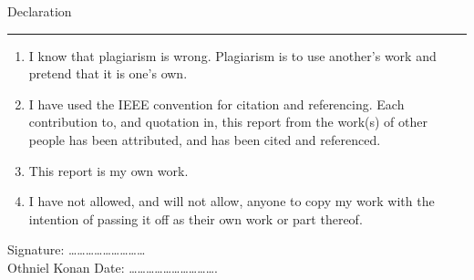 {\Large Declaration}\\
\hrule

\vskip 10mm
\begin{enumerate}
\item I know that plagiarism is wrong. Plagiarism is to use another's work and pretend that it is one's
own.
\item I have used the IEEE convention for citation and referencing. Each contribution to, and quotation in,
this report from the work(s) of other people has been attributed, and has been cited and
referenced.
\item This report is my own work.
\item I have not allowed, and will not allow, anyone to copy my work with the intention of passing it off
as their own work or part thereof.
\end{enumerate}
\vskip 10mm
Signature: \ldots\ldots\ldots\ldots\ldots\ldots\ldots\ldots\ldots 
\\Othniel Konan		%
\vskip 6mm
Date: \ldots\ldots\ldots\ldots\ldots\ldots\ldots\ldots\ldots\ldots .